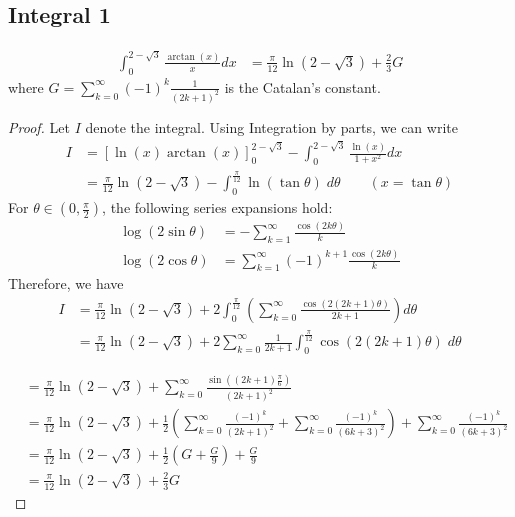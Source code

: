 \subsection{Integral 1}
\begin{align*}
\int_0^{2-\sqrt{3}}\frac{\arctan(x)}{x}dx &= \frac{\pi}{12}\ln\left(2-\sqrt{3}\right) + \frac{2}{3}G
\end{align*}
where $G= \sum_{k=0}^\infty (-1)^k \frac{1}{(2k+1)^2}$ is the Catalan's constant.
\begin{proof}
Let $I$ denote the integral. Using Integration by parts, we can write 
\begin{align*}
I &= \left[ \ln(x)\arctan(x) \right]_0^{2-\sqrt{3}} - \int_0^{2-\sqrt{3}}\frac{\ln (x)}{1+x^2}dx \\
&= \frac{\pi}{12}\ln\left(2-\sqrt{3}\right)-\int_0^{\frac{\pi}{12}} \ln\left(\tan\theta\right) \; d\theta \quad\quad (x =\tan \theta) \tag{1}
\end{align*}
For $\theta \in \left(0,\frac{\pi}{2}\right)$, the following series expansions hold:
\begin{align*}
\log(2\sin \theta ) &= -\sum_{k=1}^\infty \frac{\cos(2k \theta)}{k} \\
\log(2 \cos \theta) &= \sum_{k=1}^\infty (-1)^{k+1}\frac{\cos(2k\theta)}{k}
\end{align*}
Therefore, we have
\begin{align*}
I &= \frac{\pi}{12}\ln\left(2-\sqrt{3}\right) + 2\int_0^{\frac{\pi}{12}}\left(\sum_{k=0}^\infty \frac{\cos(2(2k+1)\theta)}{2k+1} \right) d\theta \\
&= \frac{\pi}{12}\ln\left(2-\sqrt{3}\right) + 2\sum_{k=0}^\infty\frac{1}{2k+1}\int_0^{\frac{\pi}{12}} \cos(2(2k+1)\theta) \; d\theta 
\end{align*}

\begin{align*}
&= \frac{\pi}{12}\ln\left(2-\sqrt{3}\right) + \sum_{k=0}^\infty\frac{\sin\left( (2k+1)\frac{\pi}{6}\right)}{(2k+1)^2}  \\
&=  \frac{\pi}{12}\ln\left(2-\sqrt{3}\right) +\frac{1}{2}\left( \sum_{k=0}^\infty \frac{(-1)^k}{(2k+1)^2}+ \sum_{k=0}^\infty \frac{(-1)^k}{(6k+3)^2}\right) + \sum_{k=0}^\infty \frac{(-1)^k}{(6k+3)^2} \\
&= \frac{\pi}{12}\ln\left(2-\sqrt{3}\right) +\frac{1}{2}\left(G+\frac{G}{9}\right)+\frac{G}{9} \\
&= \frac{\pi}{12}\ln\left(2-\sqrt{3}\right) + \frac{2}{3}G
\end{align*}
\end{proof}

